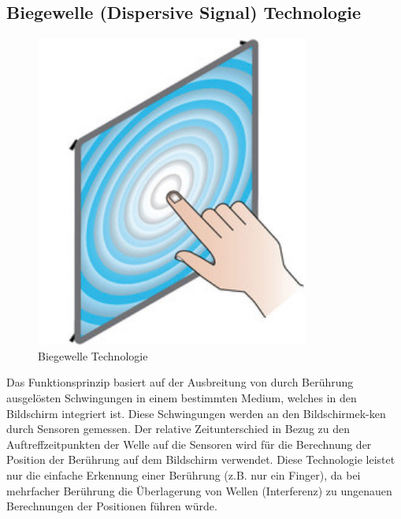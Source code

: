 \documentclass[12pt,oneside,a4paper,bibtotoc,liststotoc]{scrreprt}
\begin{document}
\subsection{Biegewelle (Dispersive Signal) Technologie}
\begin{figure}[H]
  \begin{centering}
    \includegraphics[width=0.8\textwidth]{img/Biegewelle.jpg}
    \caption{Biegewelle Technologie \cite[vgl. DST-Biegewellen]{002}}
    \label{Biegewelle}
  \end{centering}
\end{figure}
Das Funktionsprinzip basiert auf der Ausbreitung von durch Berührung ausgelösten Schwingungen in einem bestimmten Medium, welches in den Bildschirm integriert ist. Diese Schwingungen werden an den Bildschirmek-ken durch Sensoren gemessen. Der relative Zeitunterschied in Bezug zu den Auftreffzeitpunkten der Welle auf die Sensoren wird für die Berechnung der Position der Berührung auf dem Bildschirm verwendet. Diese Technologie leistet nur die einfache Erkennung einer Berührung (z.B. nur ein Finger), da bei mehrfacher Berührung die Überlagerung von Wellen (Interferenz) zu ungenauen Berechnungen der Positionen führen würde.
\end{document}
